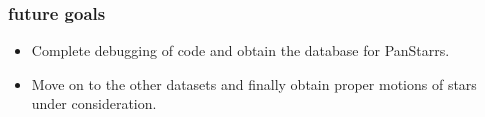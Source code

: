 \documentclass[10pt, compress]{beamer}
\begin{document}
\begin{frame}
\frametitle{future goals}
	\begin{itemize}
		\item<1-> Complete debugging of code and obtain the database for PanStarrs.
        \item<2-> Move on to the other datasets and finally obtain proper motions of stars under consideration.
	\end{itemize}
\end{frame}














\end{document}

